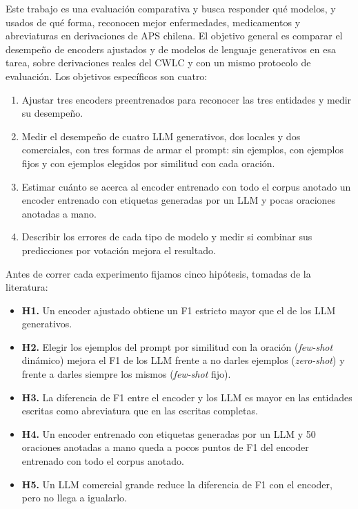 \documentclass[10pt,journal,a4paper]{IEEEtran}
\begin{document}
Este trabajo es una evaluación comparativa y busca responder qué modelos, y usados de qué forma, reconocen mejor enfermedades, medicamentos y abreviaturas en derivaciones de APS chilena. El objetivo general es comparar el desempeño de encoders ajustados y de modelos de lenguaje generativos en esa tarea, sobre derivaciones reales del CWLC y con un mismo protocolo de evaluación. Los objetivos específicos son cuatro:

\begin{enumerate}
\item Ajustar tres encoders preentrenados para reconocer las tres entidades y medir su desempeño.
\item Medir el desempeño de cuatro LLM generativos, dos locales y dos comerciales, con tres formas de armar el prompt: sin ejemplos, con ejemplos fijos y con ejemplos elegidos por similitud con cada oración.
\item Estimar cuánto se acerca al encoder entrenado con todo el corpus anotado un encoder entrenado con etiquetas generadas por un LLM y pocas oraciones anotadas a mano.
\item Describir los errores de cada tipo de modelo y medir si combinar sus predicciones por votación mejora el resultado.
\end{enumerate}

Antes de correr cada experimento fijamos cinco hipótesis, tomadas de la literatura:

\begin{itemize}
\item \textbf{H1.} Un encoder ajustado obtiene un F1 estricto mayor que el de los LLM generativos.
\item \textbf{H2.} Elegir los ejemplos del prompt por similitud con la oración (\emph{few-shot} dinámico) mejora el F1 de los LLM frente a no darles ejemplos (\emph{zero-shot}) y frente a darles siempre los mismos (\emph{few-shot} fijo).
\item \textbf{H3.} La diferencia de F1 entre el encoder y los LLM es mayor en las entidades escritas como abreviatura que en las escritas completas.
\item \textbf{H4.} Un encoder entrenado con etiquetas generadas por un LLM y 50 oraciones anotadas a mano queda a pocos puntos de F1 del encoder entrenado con todo el corpus anotado.
\item \textbf{H5.} Un LLM comercial grande reduce la diferencia de F1 con el encoder, pero no llega a igualarlo.
\end{itemize}
\end{document}
